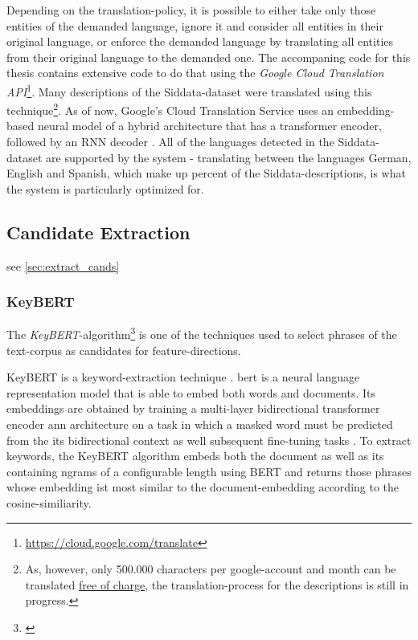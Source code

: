 Depending on the translation-policy, it is possible to either take only those entities of the demanded language, ignore it and consider all entities in their original language, or enforce the demanded language by translating all entities from their original language to the demanded one. The accompaning code for this thesis contains extensive code to do that using the \emph{Google Cloud Translation API}\footnote{\url{https://cloud.google.com/translate}}. Many descriptions of the Siddata-dataset were translated using this technique\footnote{As, however, only 500.000 characters per google-account and month can be translated \href{https://cloud.google.com/translate/pricing}{free of charge}, the translation-process for the descriptions is still in progress.}. As of now, Google's Cloud Translation Service uses an embedding-based neural model of a hybrid architecture that has a transformer encoder, followed by an RNN decoder \cite{Chen2018}. All of the languages detected in the Siddata-dataset are supported by the system - translating between the languages German, English and Spanish, which make up  percent of the Siddata-descriptions, is what the system is particularly optimized for. 


\subsection*{Candidate Extraction}

see \autoref{sec:extract_cands}

\subsubsection*{KeyBERT}
\label{ap:details_keybert}

The \emph{KeyBERT}-algorithm\footnote{\label{fnote:keybertgibhut}} \cite{grootendorst2020keybert} is one of the techniques used to select phrases of the text-corpus as candidates for \gls{feature}-directions. 

KeyBERT is a keyword-extraction technique . \Gls{bert} is a neural language representation model that is able to embed both words and documents. Its embeddings are obtained by training a multi-layer bidirectional transformer encoder \gls{ann} architecture on a task in which a masked word must be predicted from the its bidirectional context as well subsequent fine-tuning tasks \cite{Devlin2019}. To extract keywords, the KeyBERT algorithm embeds both the document as well as its containing \glspl{ngram} of a configurable length using BERT and returns those phrases whose embedding ist most similar to the document-embedding according to the cosine-similiarity.

